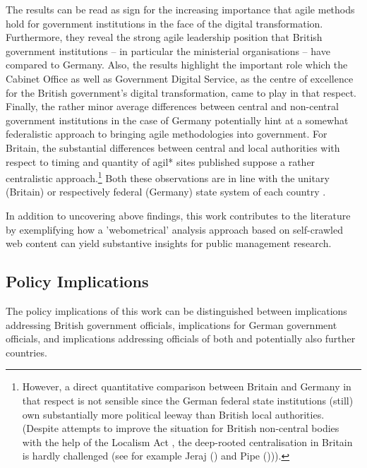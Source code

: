 \endgroup
\vspace{-0.1cm}


The results can be read as sign for the increasing importance that agile methods hold for government institutions in the face of the digital transformation. Furthermore, they reveal the strong agile leadership position that British government institutions – in particular the ministerial organisations – have compared to Germany. Also, the results highlight the important role which the Cabinet Office as well as Government Digital Service, as the centre of excellence for the British government's digital transformation, came to play in that respect. Finally, the rather minor average differences between central and non-central government institutions in the case of Germany potentially hint at a somewhat federalistic approach to bringing agile methodologies into government. For Britain, the substantial differences between central and local authorities with respect to timing and quantity of agil* sites published suppose a rather centralistic approach.\footnote{However, a direct quantitative comparison between Britain and Germany in that respect is not sensible since the German federal state institutions (still) own substantially more political leeway than British local authorities. (Despite attempts to improve the situation for British non-central bodies with the help of the Localism Act \parencite{Legislation.gov.uk2011}, the deep-rooted centralisation in Britain is hardly challenged (see for example Jeraj (\cite*{Jeraj2013}) and Pipe (\cite*{ Pipe2013}))).} Both these observations are in line with the unitary (Britain) or respectively federal (Germany) state system of each country \parencite{Elazar1997}. 

In addition to uncovering above findings, this work contributes to the literature by exemplifying how a 'webometrical' analysis approach \parencite{Thelwall2009} based on self-crawled web content can yield substantive insights for public management research. 

\subsection{Policy Implications}
The policy implications of this work can be distinguished between implications addressing British government officials, implications for German government officials, and implications addressing officials of both and potentially also further countries.


